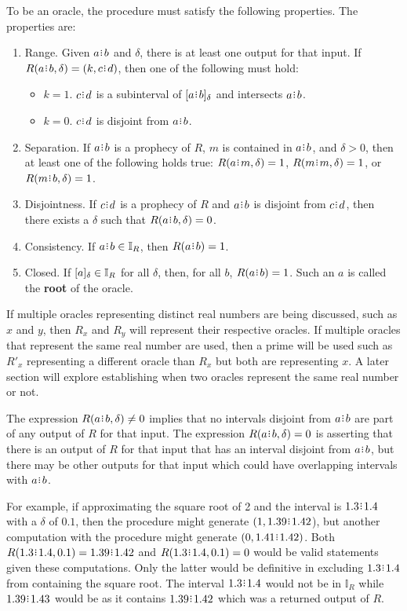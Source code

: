 \documentclass[12pt]{article}
\begin{document}
To be an oracle, the procedure must satisfy the following properties.  The properties are:
\begin{enumerate}
    \item Range. Given $a \rint b$ and $\delta$, there is at least one output for that input. If $R(a\rint b, \delta) = (k, c\rint d)$, then one of the following must hold:
    \begin{itemize}
        \item $k=1$. $c\rint d$ is a subinterval of $\halo{a\rint b}$ and intersects $a\rint b$. 
        \item $k=0$. $c\rint d$ is disjoint from $a\rint b$.
    \end{itemize} 
    \item Separation. If $a\rint b$ is a prophecy of $R$, $m$ is contained in $a\rint b$, and $\delta > 0$, then at least one of the following holds true: $R(a \rint m, \delta) =1$, $R(m \rint m, \delta) = 1$, or $R(m \rint b, \delta) = 1$.
   \item Disjointness. 
   If $c\rint d$ is a prophecy of $R$ and $a\rint b$ is disjoint from $c\rint d$, then there exists a $\delta$ such that $R(a\rint b, \delta) = 0$.
    \item Consistency. 
    If $a\rint b  \in \mathbb{I}_R$, then $R(a\rint b) = 1$.
    \item Closed. 
    If $[a]_{\delta} \in \mathbb{I}_R$ for all $\delta $, then, for all $b$, $R(a\rint b) = 1$. Such an $a$ is called the \textbf{root} of the oracle. 
\end{enumerate}

If multiple oracles representing distinct real numbers are being discussed, such as $x$ and $y$, then $R_x$ and $R_y$ will represent their respective oracles. If multiple oracles that represent the same real number are used, then a prime will be used such as $R'_x$ representing a different oracle than $R_x$ but both are representing $x$. A later section will explore establishing when two oracles represent the same real number or not. 

The expression $R(a\rint b, \delta) \neq 0$ implies that no intervals disjoint from $a\rint b$ are part of any output of $R$ for that input. The expression $R(a\rint b, \delta) = 0$ is asserting that there is an output of $R$ for that input that  has  an interval disjoint from $a \rint b$, but there may be other outputs for that input which could have overlapping intervals with $a \rint b$.

 For example, if approximating the square root of 2 and the interval is $1.3\rint 1.4$ with a $\delta$ of $0.1$, then the procedure might generate $(1, 1.39\rint 1.42$), but another computation with the procedure might generate $(0, 1.41\rint 1.42)$. Both $R(1.3\rint 1.4, 0.1) = 1.39\rint 1.42$ and $R(1.3\rint 1.4, 0.1) = 0$ would be valid statements given these computations. Only the latter would be definitive in excluding $1.3\rint 1.4$ from containing the square root. The interval $1.3\rint 1.4$ would not be in $\mathbb{I}_R$ while $1.39\rint 1.43$ would be as it contains $1.39\rint 1.42$ which was a returned output of $R$.
\end{document}
